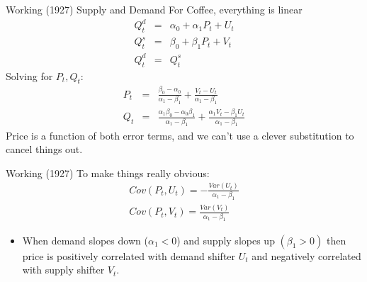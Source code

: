 \documentclass[aspectratio=169,11pt]{beamer}
\begin{document}




\begin{frame}{Working (1927)}
Supply and Demand For Coffee, everything is linear
\begin{eqnarray*}
Q_t^d &=& \alpha_0 + \alpha_1 P_t + U_t\\
Q_t^s &=& \beta_0 + \beta_1 P_t + V_t\\
Q_t^d &=& Q_t^s
\end{eqnarray*}
Solving for $P_t,Q_t$:
\begin{eqnarray*}
P_t &=& \frac{\beta_0 - \alpha_0}{\alpha_1 - \beta_1} + \frac{V_t - U_t}{\alpha_1 - \beta_1}\\
Q_t &=& \frac{\alpha_1 \beta_0 - \alpha_0 \beta_1}{\alpha_1 - \beta_1} + \frac{\alpha_1 V_t - \beta_1 U_t}{\alpha_1 - \beta_1}
\end{eqnarray*}
Price is a function of both error terms, and we can't use a clever substitution to cancel things out.
\end{frame}

\begin{frame}{Working (1927)}
To make things really obvious:
\begin{eqnarray*}
Cov(P_t,U_t) = - \frac{Var(U_t)}{\alpha_1 -\beta_1} \\
Cov(P_t,V_t) =  \frac{Var(V_t)}{\alpha_1 -\beta_1} 
\end{eqnarray*}
\begin{itemize}
\item When demand slopes down ($\alpha_1 < 0$) and supply slopes up $(\beta_1 > 0)$ then price is positively correlated with demand shifter $U_t$ and negatively correlated with supply shifter $V_t$.
\end{itemize}
\end{frame}
\end{document}
